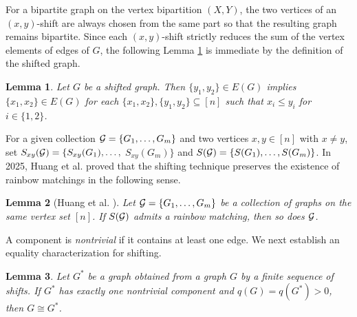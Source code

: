 \documentclass[11pt,a4paper]{article}
\newtheorem{lemma}{Lemma}[section]
\theoremstyle{definition}
\numberwithin{equation}{section}
\begin{document}
For a bipartite graph on the vertex bipartition $(X,Y)$, the two vertices of an $(x,y)$-shift are always chosen from the same part so that the resulting graph remains bipartite. Since each $(x, y)$-shift strictly reduces the sum of the vertex elements of edges of $G$, the following Lemma \ref{lemma3b} is immediate by the definition of the shifted graph.

\begin{lemma}\label{lemma3b}
Let $G$ be a shifted graph. Then $\{{{y_1},{y_2}}\}\in E(G)$ implies $\{ {{x_1},{x_2}}\} \in E(G)$ for each $\{{{x_1},{x_2}}\},\{{{y_1},{y_2}}\} \subseteq [n]$ such that ${x_i}\le {y_i}$ for $i \in \{1,2\}$.
\end{lemma}

For a given collection ${\cal G}=\{{G_1}, \ldots, {G_m}\}$ and two vertices $x,y\in[n]$ with $x \ne y$, set ${S_{xy}}({\cal G})=\{{S_{xy}}({{G_1}}),\ldots,$ ${S_{xy}}({G_m})\}$ and $S({\cal G})=\{S({G_1}),\ldots ,S({G_m})\} $. In 2025, Huang et al. \cite{Huang} proved that the shifting technique preserves the existence of rainbow matchings in the following sense.

\begin{lemma}[Huang et al. \cite{Huang}]\label{lemma4b}
Let ${\cal G}=\{{G_1}, \ldots ,{G_m}\} $ be a collection of graphs on the same vertex set $[n]$. If $S({\cal G})$ admits a rainbow matching, then so does ${\cal G}$.
\end{lemma}

A component is \emph{nontrivial} if it contains at least one edge. We next establish an equality characterization for shifting.

\begin{lemma}\label{lemma-equality-shift}
Let $G^*$ be a graph obtained from a graph $G$ by a finite sequence of shifts. If $G^*$ has exactly one nontrivial component and $q(G)=q(G^*)>0$, then $G\cong G^*$.
\end{lemma}
\end{document}
